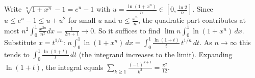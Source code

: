 \documentclass[11pt,a4paper]{article}
\begin{document}
 Write $\sqrt[n]{1+x^n}-1=e^u-1$ with $u=\frac{\ln(1+x^n)}n\in[0,\frac{\ln2}n]$. Since $u\le e^u-1\le u+u^2$ for small $u$ and $u\le\frac{x^n}n$, the quadratic part contributes at most $n^2\int_0^1\frac{x^{2n}}{n^2}dx=\frac1{2n+1}\to0$.
 So it suffices to find $\lim n\int_0^1\ln(1+x^n)\,dx$. Substitute $x=t^{1/n}$: $n\int_0^1\ln(1+x^n)\,dx=\int_0^1\frac{\ln(1+t)}t\,t^{1/n}\,dt$.
 As $n\to\infty$ this tends to $\int_0^1\frac{\ln(1+t)}t\,dt$ (the integrand increases to the limit). Expanding $\ln(1+t)$, the integral equals $\sum_{k\ge1}\frac{(-1)^{k+1}}{k^2}=\frac{\pi^2}{12}$.
\end{document}

